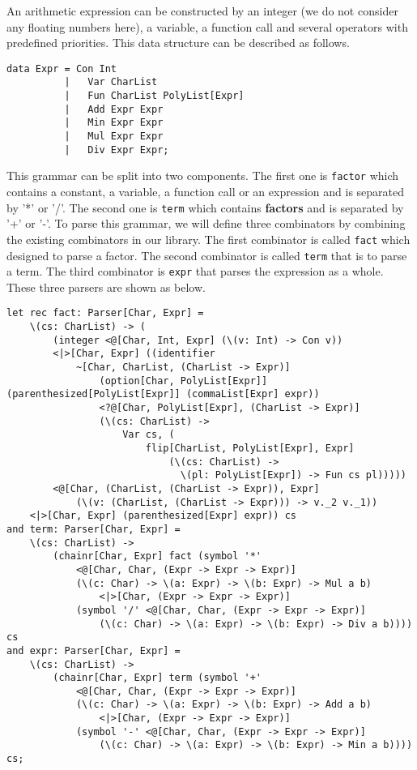 An arithmetic expression can be constructed by an integer (we do not consider any floating numbers here), a variable, a function call and several operators with predefined priorities. This data structure can be described as follows.
\begin{lstlisting}
data Expr = Con Int
          |   Var CharList
          |   Fun CharList PolyList[Expr]
          |   Add Expr Expr
          |   Min Expr Expr
          |   Mul Expr Expr
          |   Div Expr Expr;
\end{lstlisting}
This grammar can be split into two components. The first one is \texttt{factor} which contains a constant, a variable, a function call or an expression and is separated by '*' or '/'.  The second one is \texttt{term} which contains \textbf{factors} and is separated by '+' or '-'.
To parse this grammar, we will define three combinators by combining the existing combinators in our library. The first combinator is called \texttt{fact} which designed to parse a factor. The second combinator is called \texttt{term} that is to parse a term. The third combinator is \texttt{expr} that parses the expression as a whole. These three parsers are shown as below.
\begin{lstlisting}
let rec fact: Parser[Char, Expr] =
    \(cs: CharList) -> (
        (integer <@[Char, Int, Expr] (\(v: Int) -> Con v))
        <|>[Char, Expr] ((identifier 
            ~[Char, CharList, (CharList -> Expr)]
                (option[Char, PolyList[Expr]] (parenthesized[PolyList[Expr]] (commaList[Expr] expr))
                <?@[Char, PolyList[Expr], (CharList -> Expr)] 
                (\(cs: CharList) -> 
                    Var cs, (
                        flip[CharList, PolyList[Expr], Expr] 
                            (\(cs: CharList) -> 
                              \(pl: PolyList[Expr]) -> Fun cs pl)))))
        <@[Char, (CharList, (CharList -> Expr)), Expr] 
            (\(v: (CharList, (CharList -> Expr))) -> v._2 v._1))
    <|>[Char, Expr] (parenthesized[Expr] expr)) cs
and term: Parser[Char, Expr] = 
    \(cs: CharList) -> 
        (chainr[Char, Expr] fact (symbol '*' 
            <@[Char, Char, (Expr -> Expr -> Expr)] 
            (\(c: Char) -> \(a: Expr) -> \(b: Expr) -> Mul a b)
                <|>[Char, (Expr -> Expr -> Expr)] 
            (symbol '/' <@[Char, Char, (Expr -> Expr -> Expr)] 
                (\(c: Char) -> \(a: Expr) -> \(b: Expr) -> Div a b)))) cs
and expr: Parser[Char, Expr] = 
    \(cs: CharList) -> 
        (chainr[Char, Expr] term (symbol '+' 
            <@[Char, Char, (Expr -> Expr -> Expr)] 
            (\(c: Char) -> \(a: Expr) -> \(b: Expr) -> Add a b)
                <|>[Char, (Expr -> Expr -> Expr)] 
            (symbol '-' <@[Char, Char, (Expr -> Expr -> Expr)] 
                (\(c: Char) -> \(a: Expr) -> \(b: Expr) -> Min a b)))) cs;
\end{lstlisting}
